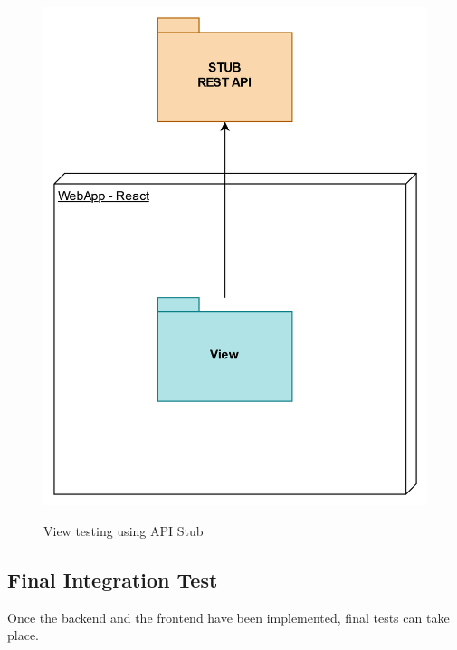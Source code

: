 \documentclass{Configuration_Files/Template}
\begin{document}
\begin{figure}[H]
\centering
\includegraphics[scale = 0.55]{Images/diagrams/ImplementationPlan_CS.png}\\
\caption{View testing using API Stub}
\end{figure}

\subsection{Final Integration Test}

Once the backend and the frontend have been implemented, final tests can take place.
\end{document}
